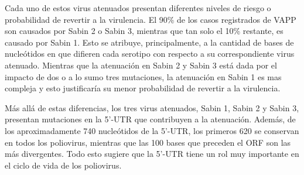 Cada uno de estos virus atenuados presentan diferentes niveles de riesgo o
probabilidad de revertir a la virulencia. El 90\% de los casos registrados de
\ac{VAPP} son causados por Sabin 2 o Sabin 3, mientras que tan solo el 10\%
restante, es causado por Sabin 1\cite{Philip92}. Esto se atribuye,
principalmente, a la cantidad de bases de nucle\'otidos en que difieren cada
serotipo con respecto a su correspondiente virus atenuado. Mientras que la
atenuaci\'on en Sabin 2 y Sabin 3 est\'a dada por el impacto de dos
o a lo sumo tres mutaciones, la atenuaci\'on en Sabin 1 es mas compleja y esto
justificar\'ia su menor probabilidad de revertir a la virulencia\cite{Philip92}.

M\'as all\'a de estas diferencias, los tres virus atenuados, Sabin 1, Sabin 2 y
Sabin 3, presentan mutaciones en la 5'-\ac{UTR} que contribuyen a la
atenuaci\'on. Adem\'as, de los aproximadamente 740 nucle\'otidos de la
5'-\ac{UTR}, los primeros 620 se conservan en todos los poliovirus, mientras que
las 100 bases que preceden el \ac{ORF} son las m\'as divergentes. Todo esto
sugiere que la 5'-\ac{UTR} tiene un rol muy importante en el ciclo de vida de
los poliovirus\cite{Philip92}.

